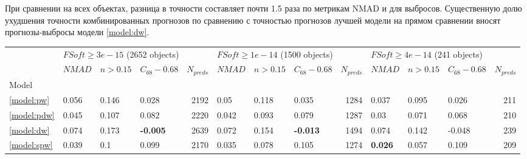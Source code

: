 \documentclass[fleqn,usenatbib]{mnras}
\begin{document}
При сравнении на всех объектах, разница в точности составляет почти 1.5 раза по метрикам NMAD и для выбросов. Существенную долю ухудшения точности комбинированных прогнозов по сравнению с точностью прогнозов лучшей модели на прямом сравнении вносят прогнозы-выбросы модели \ref{model:dw}.

\begin{table}
	\begin{tabular}{llllrlllrlllr}
            \hline
            {} & \multicolumn{4}{l}{$FSoft \geq 3e-15$ (2652 objects)} & \multicolumn{4}{l}{$FSoft \geq 1e-14$ (1500 objects)} & \multicolumn{4}{l}{$FSoft \geq 4e-14$ (241 objects)} \\
            {} &                            $NMAD$ &        $n>0.15$ &  $C_{68} - 0.68$ & $N_{preds}$ &                            $NMAD$ &       $n>0.15$ &  $C_{68} - 0.68$ & $N_{preds}$ &                           $NMAD$ &        $n>0.15$ &  $C_{68} - 0.68$ & $N_{preds}$ \\
            Model                               &                                   &                 &                  &             &                                   &                &                  &             &                                  &                 &                  &             \\
            \hline
            \ref{model:pw}                      &                             0.056 &           0.146 &            0.028 &        2192 &                              0.05 &          0.118 &            0.035 &        1284 &                            0.037 &           0.095 &            0.026 &         211 \\
            \ref{model:pdw}                     &                             0.045 &           0.107 &            0.082 &        2220 &                             0.042 &          0.093 &            0.079 &        1287 &                             0.03 &           0.071 &            0.068 &         210 \\
            \ref{model:dw}                      &                             0.074 &           0.173 &  \textbf{-0.005} &        2639 &                             0.072 &          0.154 &  \textbf{-0.013} &        1494 &                            0.074 &           0.142 &           -0.048 &         239 \\
            \ref{model:spw}                     &                             0.039 &             0.1 &            0.099 &        2170 &                             0.035 &          0.078 &            0.105 &        1274 &                   \textbf{0.026} &           0.057 &            0.109 &         209 \\

\end{tabular}
\end{table}
\end{document}

